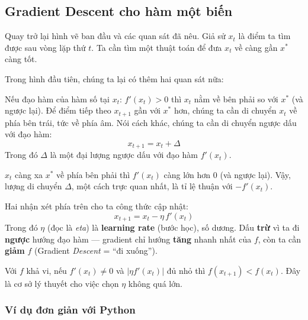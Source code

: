\subsection{Gradient Descent cho hàm một biến}

\begin{ynghia}[title={Quan sát từ đồ thị}]
Quay trở lại hình vẽ ban đầu và các quan sát đã nêu. Giả sử $x_t$ là điểm ta tìm được sau vòng lặp thứ $t$. Ta cần tìm một thuật toán để đưa $x_t$ về càng gần $x^*$ càng tốt.

Trong hình đầu tiên, chúng ta lại có thêm hai quan sát nữa:

Nếu đạo hàm của hàm số tại $x_t$: $f'(x_t) > 0$ thì $x_t$ nằm về bên phải so với $x^*$ (và ngược lại). Để điểm tiếp theo $x_{t+1}$ gần với $x^*$ hơn, chúng ta cần di chuyển $x_t$ về phía bên trái, tức về phía âm. Nói cách khác, chúng ta cần di chuyển ngược dấu với đạo hàm:
\[
x_{t+1} = x_t + \Delta
\]
Trong đó $\Delta$ là một đại lượng ngược dấu với đạo hàm $f'(x_t)$.

$x_t$ càng xa $x^*$ về phía bên phải thì $f'(x_t)$ càng lớn hơn $0$ (và ngược lại). Vậy, lượng di chuyển $\Delta$, một cách trực quan nhất, là tỉ lệ thuận với $-f'(x_t)$.
\end{ynghia}

\begin{congthuc}[title={Cập nhật Gradient Descent một biến}]
Hai nhận xét phía trên cho ta công thức cập nhật:
\[
x_{t+1} = x_t - \eta\, f'(x_t)
\]
Trong đó $\eta$ (đọc là \emph{eta}) là \textbf{learning rate} (bước học), số dương. Dấu \textbf{trừ} vì ta đi \textbf{ngược} hướng đạo hàm --- gradient chỉ hướng \textbf{tăng} nhanh nhất của $f$, còn ta cần \textbf{giảm} $f$ (Gradient \emph{Descent} = ``đi xuống'').
\end{congthuc}

\begin{ynghia}[title={Điều kiện giảm hàm (một biến, $\eta$ nhỏ)}]
Với $f$ khả vi, nếu $f'(x_t) \neq 0$ và $|\eta f'(x_t)|$ đủ nhỏ thì $f(x_{t+1}) < f(x_t)$. Đây là cơ sở lý thuyết cho việc chọn $\eta$ không quá lớn.
\end{ynghia}

\subsubsection{Ví dụ đơn giản với Python}

